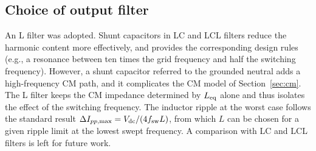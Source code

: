 \subsection{Choice of output filter}
An L filter was adopted. Shunt capacitors in LC and LCL filters reduce the harmonic content more effectively, and \cite{Reznik2014} provides the corresponding design rules (e.g., a resonance between ten times the grid frequency and half the switching frequency). However, a shunt capacitor referred to the grounded neutral adds a high-frequency CM path, and it complicates the CM model of Section~\ref{sec:cm}. The L filter keeps the CM impedance determined by $L_{\mathrm{eq}}$ alone and thus isolates the effect of the switching frequency. The inductor ripple at the worst case follows the standard result $\Delta I_{pp,\max}=V_{\mathrm{dc}}/(4f_{\mathrm{sw}} L)$, from which $L$ can be chosen for a given ripple limit at the lowest swept frequency. A comparison with LC and LCL filters is left for future work.
